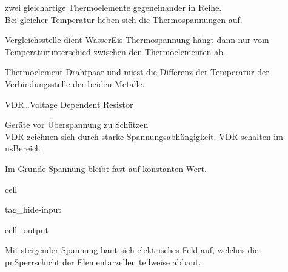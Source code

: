\documentclass[letterpaper,10pt,english]{jupyterBook}
\begin{document}
\begin{DUlineblock}{0em}
\item[] 
\end{DUlineblock}

\sphinxAtStartPar
zwei gleichartige Thermoelemente gegeneinander in Reihe.\\
Bei gleicher Temperatur heben sich die Thermospannungen auf.

\sphinxAtStartPar
Vergleichsstelle dient Wasser\sphinxhyphen{}Eis Thermospannung hängt dann nur vom Temperaturunterschied zwischen den Thermoelementen ab.

\begin{DUlineblock}{0em}
\item[] 
\end{DUlineblock}

\sphinxAtStartPar
Thermoelement Drahtpaar und misst die Differenz der Temperatur der Verbindungsstelle der beiden Metalle.

\begin{DUlineblock}{0em}
\item[] 
\end{DUlineblock}

\sphinxAtStartPar
VDR…Voltage Dependent Resistor

\sphinxAtStartPar
Geräte vor Überspannung zu Schützen\\
VDR zeichnen sich durch starke Spannungsabhängigkeit. VDR schalten im ns\sphinxhyphen{}Bereich

\sphinxAtStartPar
Im Grunde Spannung bleibt fast auf konstanten Wert.

\begin{sphinxuseclass}{cell}
\begin{sphinxuseclass}{tag_hide-input}\begin{sphinxVerbatimOutput}

\begin{sphinxuseclass}{cell_output}
\noindent{}

\end{sphinxuseclass}\end{sphinxVerbatimOutput}

\end{sphinxuseclass}
\end{sphinxuseclass}
\sphinxAtStartPar
Mit steigender Spannung baut sich elektrisches Feld auf, welches die pn\sphinxhyphen{}Sperrschicht der Elementarzellen teilweise abbaut.
\end{document}

